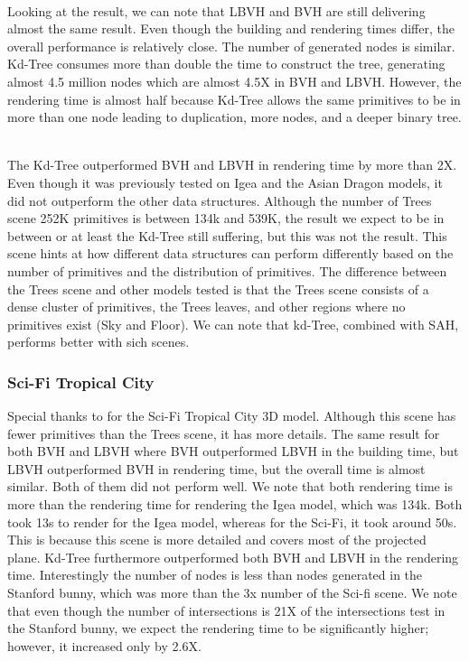 \documentclass[11pt,a4paper]{article}
\begin{document}
\noindent
\\
Looking at the result, we can note that LBVH and BVH are still delivering almost the same result. Even though the building and rendering times differ, the overall performance is relatively close. The number of generated nodes is similar. Kd-Tree consumes more than double the time to construct the tree, generating almost 4.5 million nodes which are almost 4.5X in BVH and LBVH. However, the rendering time is almost half because Kd-Tree allows the same primitives to be in more than one node leading to duplication, more nodes, and a deeper binary tree. 

\noindent
\\
The Kd-Tree outperformed BVH and LBVH in rendering time by more than 2X. Even though it was previously tested on Igea and the Asian Dragon models, it did not outperform the other data structures. Although the number of Trees scene 252K primitives is between 134k and 539K, the result we expect to be in between or at least the Kd-Tree still suffering, but this was not the result. This scene hints at how different data structures can perform differently based on the number of primitives and the distribution of primitives. The difference between the Trees scene and other models tested is that the Trees scene consists of a dense cluster of primitives, the Trees leaves, and other regions where no primitives exist (Sky and Floor). We can note that kd-Tree, combined with SAH, performs better with sich scenes. 


\subsubsection{Sci-Fi Tropical City}
Special thanks to \protect\cite{scifi} for the Sci-Fi Tropical City 3D model. Although this scene has fewer primitives than the Trees scene, it has more details. The same result for both BVH and LBVH where BVH outperformed LBVH in the building time, but LBVH outperformed BVH in rendering time, but the overall time is almost similar. Both of them did not perform well. We note that both rendering time is more than the rendering time for rendering the Igea model, which was 134k. Both took 13s to render for the Igea model, whereas for the Sci-Fi, it took around 50s. This is because this scene is more detailed and covers most of the projected plane. Kd-Tree furthermore outperformed both BVH and LBVH in the rendering time. Interestingly the number of nodes is less than nodes generated in the Stanford bunny, which was more than the 3x number of the Sci-fi scene. We note that even though the number of intersections is 21X of the intersections test in the Stanford bunny, we expect the rendering time to be significantly higher; however, it increased only by 2.6X. 
\end{document}
